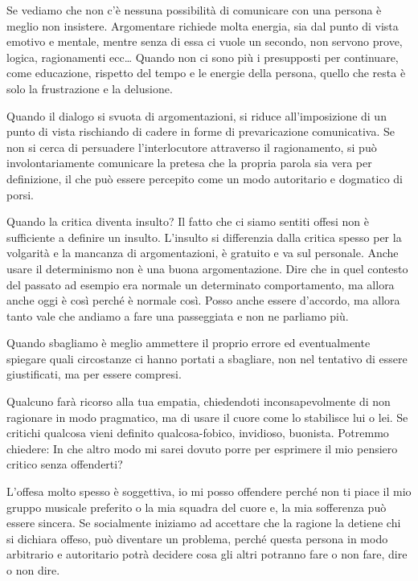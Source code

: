 \documentclass[12pt]{book} %
\begin{document}
Se vediamo che non c'è nessuna possibilità di comunicare con una persona è meglio non insistere. Argomentare richiede molta
energia, sia dal punto di vista emotivo e mentale, mentre senza di essa ci vuole un secondo, non servono prove, logica, ragionamenti ecc… Quando non ci sono più i presupposti per continuare, come educazione, rispetto del tempo e le energie della persona, quello che resta è solo la frustrazione e la delusione. 

Quando il dialogo si svuota di argomentazioni, si riduce all'imposizione di un punto di vista rischiando di cadere in forme di prevaricazione comunicativa. Se non si cerca di persuadere l'interlocutore attraverso il ragionamento, si può involontariamente comunicare la pretesa che la propria parola sia vera per definizione, il che può essere percepito come un modo autoritario e dogmatico di porsi. 

Quando la critica diventa insulto? Il fatto che ci siamo sentiti offesi non è sufficiente a definire un insulto.
L'insulto si differenzia dalla critica spesso per la volgarità e la mancanza di argomentazioni, è gratuito e va sul personale. 
Anche usare il determinismo non è una buona argomentazione. Dire che in quel contesto del passato ad esempio era normale un determinato comportamento, ma allora anche oggi è così perché è normale così. Posso anche essere d'accordo, ma allora tanto vale che andiamo a fare una passeggiata e non ne parliamo più.

Quando sbagliamo è meglio ammettere il proprio errore ed eventualmente spiegare quali circostanze
ci hanno portati a sbagliare, non nel tentativo di essere giustificati, ma per essere compresi.

Qualcuno farà ricorso alla tua empatia, chiedendoti inconsapevolmente di non ragionare in modo pragmatico, ma di usare il cuore come lo stabilisce lui o lei. Se critichi qualcosa vieni definito qualcosa-fobico, invidioso, buonista. Potremmo chiedere: In che altro modo mi sarei dovuto porre per esprimere il mio pensiero critico senza offenderti?

L'offesa molto spesso è soggettiva, io mi posso offendere perché non ti piace il mio gruppo musicale preferito o la mia squadra del cuore e, la mia sofferenza può essere sincera. Se socialmente iniziamo ad accettare che la ragione la detiene chi si dichiara offeso, può diventare un problema, perché questa persona in modo
arbitrario e autoritario potrà decidere cosa gli altri potranno fare o non fare, dire o non dire.
\end{document}
